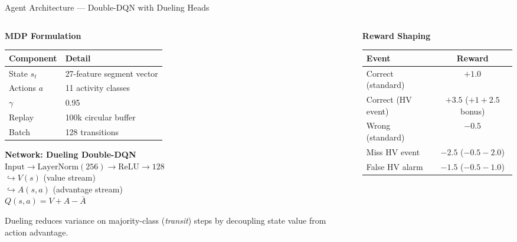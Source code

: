\documentclass[aspectratio=169,10pt]{beamer}
\begin{document}
\begin{frame}{Agent Architecture — Double-DQN with Dueling Heads}
  \begin{columns}[T]
    \begin{column}{0.50\textwidth}
      \textbf{MDP Formulation}

      \medskip
      \begin{tabular}{ll}
        \toprule
        Component & Detail \\
        \midrule
        State $s_t$ & 27-feature segment vector \\
        Actions $a$ & 11 activity classes \\
        $\gamma$ & 0.95 \\
        Replay & 100k circular buffer \\
        Batch & 128 transitions \\
        \bottomrule
      \end{tabular}

      \bigskip
      \textbf{Network: Dueling Double-DQN}\\
      \smallskip
      $\text{Input} \to \text{LayerNorm}(256) \to \text{ReLU} \to 128$\\
      $\hookrightarrow V(s)$ (value stream)\\
      $\hookrightarrow A(s,a)$ (advantage stream)\\
      $Q(s,a) = V + A - \bar{A}$

      \bigskip
      Dueling reduces variance on majority-class (\textit{transit}) steps
      by decoupling state value from action advantage.
    \end{column}
    \begin{column}{0.46\textwidth}
      \textbf{Reward Shaping}

      \medskip
      \begin{tabular}{lc}
        \toprule
        Event & Reward \\
        \midrule
        Correct (standard) & $+1.0$ \\
        Correct (HV event) & $+3.5$ \scriptsize{($+1{+}2.5$ bonus)} \\
        Wrong (standard) & $-0.5$ \\
        Miss HV event & $-2.5$ \scriptsize{($-0.5{-}2.0$)} \\
        False HV alarm & $-1.5$ \scriptsize{($-0.5{-}1.0$)} \\
        \bottomrule
      \end{tabular}


\end{column}
\end{columns}
\end{frame}
\end{document}
